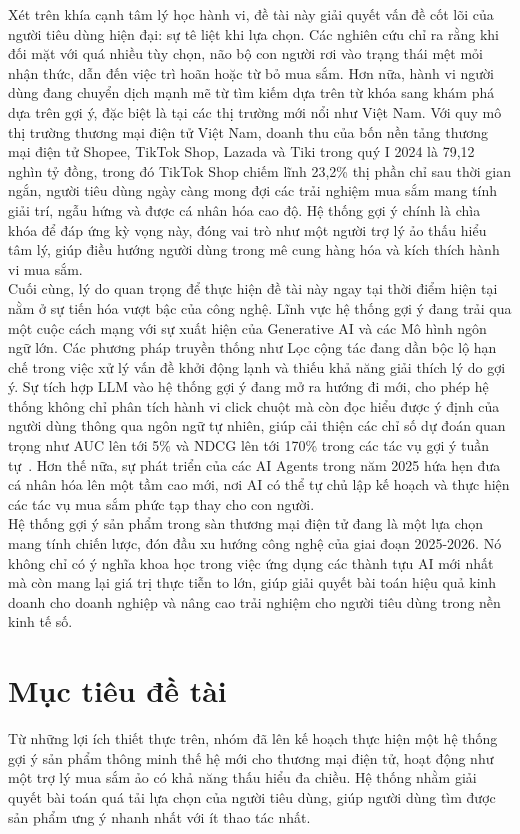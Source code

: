 Xét trên khía cạnh tâm lý học hành vi, đề tài này giải quyết vấn đề cốt lõi của người tiêu dùng hiện đại: sự tê liệt khi lựa chọn. Các nghiên cứu chỉ ra rằng khi đối mặt với quá nhiều tùy chọn, não bộ con người rơi vào trạng thái mệt mỏi nhận thức, dẫn đến việc trì hoãn hoặc từ bỏ mua sắm. Hơn nữa, hành vi người dùng đang chuyển dịch mạnh mẽ từ tìm kiếm dựa trên từ khóa sang khám phá dựa trên gợi ý, đặc biệt là tại các thị trường mới nổi như Việt Nam. Với quy mô thị trường thương mại điện tử Việt Nam, doanh thu của bốn nền tảng thương mại điện tử Shopee, TikTok Shop, Lazada và Tiki trong quý I 2024 là 79,12 nghìn tỷ đồng, trong đó TikTok Shop chiếm lĩnh 23,2\% thị phần chỉ sau thời gian ngắn\cite{17}, người tiêu dùng ngày càng mong đợi các trải nghiệm mua sắm mang tính giải trí, ngẫu hứng và được cá nhân hóa cao độ. Hệ thống gợi ý chính là chìa khóa để đáp ứng kỳ vọng này, đóng vai trò như một người trợ lý ảo thấu hiểu tâm lý, giúp điều hướng người dùng trong mê cung hàng hóa và kích thích hành vi mua sắm.\\

Cuối cùng, lý do quan trọng để thực hiện đề tài này ngay tại thời điểm hiện tại nằm ở sự tiến hóa vượt bậc của công nghệ. Lĩnh vực hệ thống gợi ý đang trải qua một cuộc cách mạng với sự xuất hiện của Generative AI và các Mô hình ngôn ngữ lớn. Các phương pháp truyền thống như Lọc cộng tác đang dần bộc lộ hạn chế trong việc xử lý vấn đề khởi động lạnh và thiếu khả năng giải thích lý do gợi ý. Sự tích hợp LLM vào hệ thống gợi ý đang mở ra hướng đi mới, cho phép hệ thống không chỉ phân tích hành vi click chuột mà còn đọc hiểu được ý định của người dùng thông qua ngôn ngữ tự nhiên, giúp cải thiện các chỉ số dự đoán quan trọng như AUC lên tới 5\% và NDCG lên tới 170\% trong các tác vụ gợi ý tuần tự~\cite{5}. Hơn thế nữa, sự phát triển của các AI Agents trong năm 2025 hứa hẹn đưa cá nhân hóa lên một tầm cao mới, nơi AI có thể tự chủ lập kế hoạch và thực hiện các tác vụ mua sắm phức tạp thay cho con người.\\

Hệ thống gợi ý sản phẩm trong sàn thương mại điện tử đang là một lựa chọn mang tính chiến lược, đón đầu xu hướng công nghệ của giai đoạn 2025-2026. Nó không chỉ có ý nghĩa khoa học trong việc ứng dụng các thành tựu AI mới nhất mà còn mang lại giá trị thực tiễn to lớn, giúp giải quyết bài toán hiệu quả kinh doanh cho doanh nghiệp và nâng cao trải nghiệm cho người tiêu dùng trong nền kinh tế số.

\section{Mục tiêu đề tài}
Từ những lợi ích thiết thực trên, nhóm đã lên kế hoạch thực hiện một hệ thống gợi ý sản phẩm thông minh thế hệ mới cho thương mại điện tử, hoạt động như một trợ lý mua sắm ảo có khả năng thấu hiểu đa chiều. Hệ thống nhằm giải quyết bài toán quá tải lựa chọn của người tiêu dùng, giúp người dùng tìm được sản phẩm ưng ý nhanh nhất với ít thao tác nhất.\\

